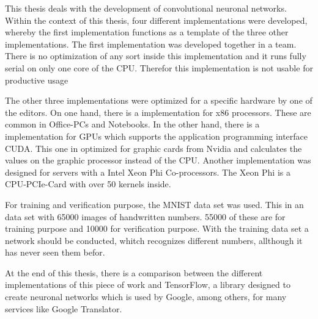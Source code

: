 \documentclass[../main.tex]{subfiles}
\begin{document}
This thesis deals with the development of convolutional neuronal networks. Within the context of this thesis, four different implementations were developed, whereby the first implementation functions as a template of the three other implementations. The first implementation was developed together in a team. There is no optimization of any sort inside this implementation and it runs fully serial on only one core of the CPU. Therefor this implementation is not usable for productive usage

The other three implementations were optimized for a specific hardware by one of the editors. On one hand, there is a implementation for x86 processors. These are common in Office-PCs and Notebooks. In the other hand, there is a implementation for GPUs which supports the application programming interface CUDA. This one in optimized for graphic cards from Nvidia and calculates the values on the graphic processor instead of the CPU. Another implementation was designed for servers with a Intel Xeon Phi Co-processors. The Xeon Phi is a CPU-PCIe-Card with over 50 kernels inside.

For training and verification purpose, the MNIST data set was used. This in an data set with 65000 images of handwritten numbers. 55000 of these are for training purpose and 10000 for verification purpose. With the training data set a network should be conducted, whitch recognizes different numbers, allthough it has never seen them befor.

At the end of this thesis, there is a comparison between the different implementations of this piece of work and TensorFlow, a library designed to create neuronal networks which is used by Google, among others, for many services like Google Translator.
\end{document}
